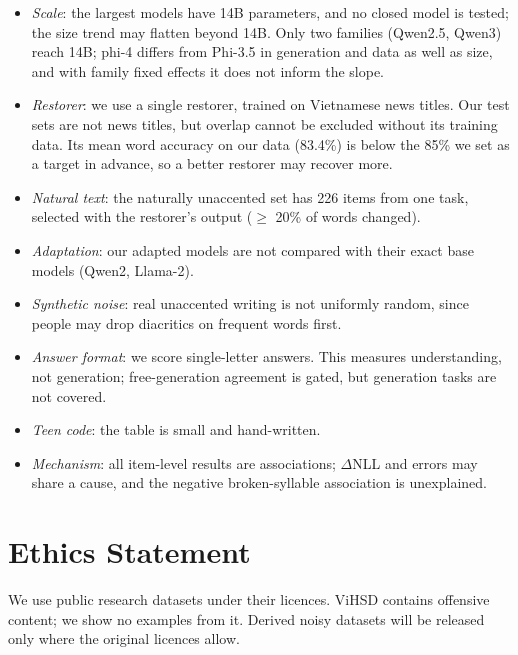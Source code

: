 \documentclass[conference]{IEEEtran}
\begin{document}
\begin{itemize}
\item \emph{Scale}: the largest models have 14B parameters, and no closed model is tested; the size trend may flatten beyond 14B. Only two families (Qwen2.5, Qwen3) reach 14B; phi-4 differs from Phi-3.5 in generation and data as well as size, and with family fixed effects it does not inform the slope.
\item \emph{Restorer}: we use a single restorer, trained on Vietnamese news titles. Our test sets are not news titles, but overlap cannot be excluded without its training data. Its mean word accuracy on our data (83.4\%) is below the 85\% we set as a target in advance, so a better restorer may recover more.
\item \emph{Natural text}: the naturally unaccented set has 226 items from one task, selected with the restorer's output ($\geq$ 20\% of words changed).
\item \emph{Adaptation}: our adapted models are not compared with their exact base models (Qwen2, Llama-2).
\item \emph{Synthetic noise}: real unaccented writing is not uniformly random, since people may drop diacritics on frequent words first.
\item \emph{Answer format}: we score single-letter answers. This measures understanding, not generation; free-generation agreement is gated, but generation tasks are not covered.
\item \emph{Teen code}: the table is small and hand-written.
\item \emph{Mechanism}: all item-level results are associations; $\Delta$NLL and errors may share a cause, and the negative broken-syllable association is unexplained.
\end{itemize}

\section*{Ethics Statement}
We use public research datasets under their licences. ViHSD contains offensive content; we show no examples from it. Derived noisy datasets will be released only where the original licences allow.



\end{document}
